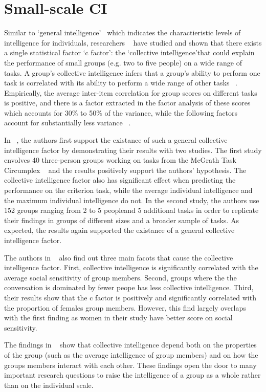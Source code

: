 \section{Small-scale CI}
Similar to \lq general intelligence\rq ~\cite{deary2000looking} which indicates the charactieristic levels of intelligence for individuals, researchers ~\cite{science} have studied and shown that there exists a single statistical factor \lq c factor\rq : the \lq collective intelligence\rq that could explain the performance of small groups (e.g. two to five people) on a wide range of tasks. A group's collective intelligence infers that a group's ability to perform one task is correlated with its ability to perform a wide range of other tasks ~\cite{science}. Empirically, the average inter-item correlation for group scores on different tasks is positive, and there is a factor extracted in the factor analysis of these scores which accounts for 30$\%$ to 50$\%$ of the variance, while the following factors account for substantially less variance ~\cite{science}. 

In ~\cite{science}, the authors first support the existance of such a general collective intelligence factor by demonstrating their results with two studies. The first study envolves 40 three-person groups working on tasks from the McGrath Task Circumplex ~\cite{mcgrath1984groups} and the results positively support the authors' hypothesis. The collective intelligence factor also has significant effect when predicting the performance on the criterion task, while the average individual intelligence and the maximum individual intelligence do not. In the second study, the authors use 152 groups ranging from 2 to 5 peopleand 5 additional tasks in order to replicate their findings in groups of different sizes and a broader sample of tasks. As expected, the results again supported the existance of a general collective intelligence factor.

The authors in ~\cite{science} also find out three main facots that cause the collective intelligence factor. First, collective intelligence is significantly correlated with the average social sensitivity of group members. Second, groups where the the conversation is dominated by fewer peope has less collective intelligence. Third, their results show that the c factor is positively and significantly correlated with the proportion of females group members. However, this find largely overlaps with the first finding as women in their study have better score on social sensitivity.

The findings in ~\cite{science} show that collective intelligence depend both on the properties of the group (such as the average intelligence of group members) and on how the groups members interact with each other. These findings open the door to many important research questions to raise the intelligence of a group as a whole rather than on the individual scale. 
